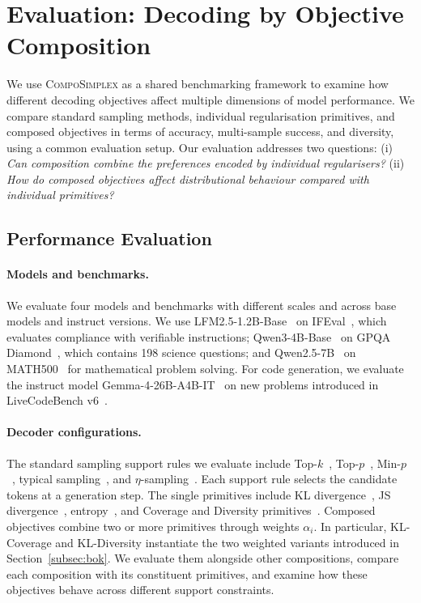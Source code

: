 \documentclass{article} %
\begin{document}
\section{Evaluation: Decoding by Objective Composition}\label{sec:evaluation}
We use \textsc{CompoSimplex} as a shared benchmarking framework to examine how different decoding objectives affect multiple dimensions of model performance. We compare standard sampling methods, individual regularisation primitives, and composed objectives in terms of accuracy, multi-sample success, and diversity, using a common evaluation setup. 
Our evaluation addresses two questions:
(i) \emph{Can composition combine the preferences encoded by individual regularisers?}
(ii) \emph{How do composed objectives affect distributional behaviour compared with individual primitives?}

\subsection{Performance Evaluation}

\paragraph{Models and benchmarks.}
We evaluate four models and benchmarks with different scales and across base models and instruct versions. We use LFM2.5-1.2B-Base~\citep{liquidai2025lfm2} on IFEval~\citep{zhou2023instruction}, which evaluates compliance with verifiable instructions; Qwen3-4B-Base~\citep{yang2025qwen3} on GPQA Diamond~\citep{rein2024gpqa}, which contains 198 science questions; and Qwen2.5-7B~\citep{qwen2025qwen25technicalreport} on MATH500~\citep{lightman2023let} for mathematical problem solving. For code generation, we evaluate the instruct model Gemma-4-26B-A4B-IT~\citep{gemmateam2026gemma4} on new problems introduced in LiveCodeBench v6~\citep{jain2024livecodebench}.

\paragraph{Decoder configurations.} The standard sampling support rules we evaluate include Top-$k$~\citep{fan2018hierarchicalneuralstorygeneration}, Top-$p$~\citep{holtzman2019curious}, Min-$p$~\citep{nguyen2025turning}, typical sampling~\citep{meister2023locally}, and $\eta$-sampling~\citep{hewitt2022truncation}. Each support rule selects the candidate tokens at a generation step.
The single primitives include KL divergence~\citep{kullback1951information}, JS divergence~\citep{lin1991divergence}, entropy~\citep{jaynes1957information}, and Coverage and Diversity primitives~\citep{boneh1997coupon}.
Composed objectives combine two or more primitives through weights $\alpha_i$. In particular, KL-Coverage and KL-Diversity instantiate the two weighted variants introduced in Section~\ref{subsec:bok}. We evaluate them alongside other compositions, compare each composition with its constituent primitives, and examine how these objectives behave across different support constraints.
\end{document}
